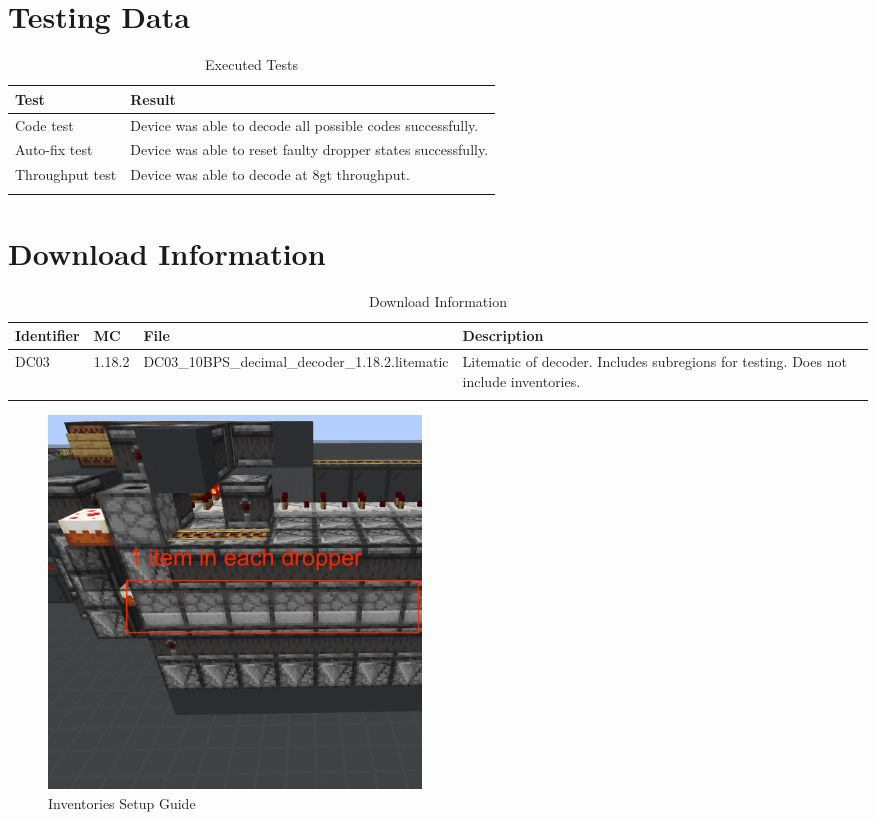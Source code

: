 \documentclass[10pt]{datasheet}
\begin{document}
\section{Testing Data}
\begin{table}[h]
\caption{Executed Tests}
\begin{tabularx}{\textwidth}{l | X}
    \thickhline
    \textbf{Test} & \textbf{Result} \\
    \hline
    Code test & Device was able to decode all possible codes successfully.\\
    \hline
    Auto-fix test & Device was able to reset faulty dropper states successfully.\\
    \hline
    Throughput test & Device was able to decode at 8gt throughput.\\
    \thickhline
\end{tabularx}
\end{table}

\section{Download Information}
\begin{table}[h]
    \caption{Download Information}
    \begin{tabularx}{\textwidth}{l | l | l | X}
        \thickhline
        \textbf{Identifier} & \textbf{MC} & \textbf{File} & \textbf{Description} \\
        \hline
        DC03 & 1.18.2 & DC03\_10BPS\_decimal\_decoder\_1.18.2.litematic & Litematic of decoder. Includes subregions for testing. Does not include inventories. \\
        \hline
        \thickhline
    \end{tabularx}
\end{table}

\begin{figure}[h]
    \includegraphics[width=0.48\textwidth]{inv.png}
    \caption{Inventories Setup Guide}
\end{figure}
\end{document}
